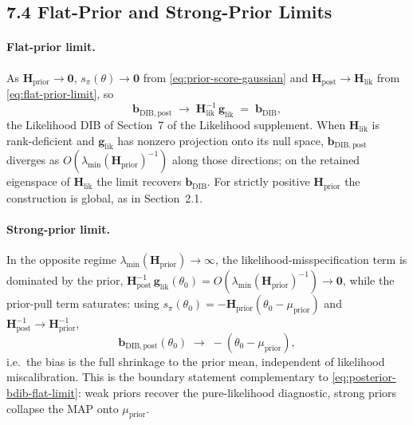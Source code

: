 \documentclass[11pt]{article}
\begin{document}
\subsection*{7.4 Flat-Prior and Strong-Prior Limits}

\paragraph{Flat-prior limit.}
As $\mathbf H_{\mathrm{prior}} \to \mathbf 0$, $s_\pi(\theta) \to \mathbf 0$ from \eqref{eq:prior-score-gaussian} and $\mathbf H_{\mathrm{post}} \to \mathbf H_{\mathrm{lik}}$ from \eqref{eq:flat-prior-limit}, so
\begin{equation}
\mathbf b_{\mathrm{DIB},\mathrm{post}}
\;\longrightarrow\;
\mathbf H_{\mathrm{lik}}^{-1}\,\mathbf g_{\mathrm{lik}}
\;=\;
\mathbf b_{\mathrm{DIB}},
\label{eq:posterior-bdib-flat-limit}
\end{equation}
the Likelihood DIB of Section~7 of the Likelihood supplement. When $\mathbf H_{\mathrm{lik}}$ is rank-deficient and $\mathbf g_{\mathrm{lik}}$ has nonzero projection onto its null space, $\mathbf b_{\mathrm{DIB},\mathrm{post}}$ diverges as $O(\lambda_{\min}(\mathbf H_{\mathrm{prior}})^{-1})$ along those directions; on the retained eigenspace of $\mathbf H_{\mathrm{lik}}$ the limit recovers $\mathbf b_{\mathrm{DIB}}$. For strictly positive $\mathbf H_{\mathrm{prior}}$ the construction is global, as in Section~2.1.

\paragraph{Strong-prior limit.}
In the opposite regime $\lambda_{\min}(\mathbf H_{\mathrm{prior}}) \to \infty$, the likelihood-misspecification term is dominated by the prior, $\mathbf H_{\mathrm{post}}^{-1}\,\mathbf g_{\mathrm{lik}}(\theta_0) = O(\lambda_{\min}(\mathbf H_{\mathrm{prior}})^{-1}) \to \mathbf 0$, while the prior-pull term saturates: using $s_\pi(\theta_0) = -\mathbf H_{\mathrm{prior}}(\theta_0 - \mu_{\mathrm{prior}})$ and $\mathbf H_{\mathrm{post}}^{-1} \to \mathbf H_{\mathrm{prior}}^{-1}$,
\begin{equation}
\mathbf b_{\mathrm{DIB},\mathrm{post}}(\theta_0)
\;\longrightarrow\;
-(\theta_0 - \mu_{\mathrm{prior}}),
\label{eq:posterior-bdib-strong-limit}
\end{equation}
i.e.\ the bias is the full shrinkage to the prior mean, independent of likelihood miscalibration. This is the boundary statement complementary to \eqref{eq:posterior-bdib-flat-limit}: weak priors recover the pure-likelihood diagnostic, strong priors collapse the MAP onto $\mu_{\mathrm{prior}}$.
\end{document}
